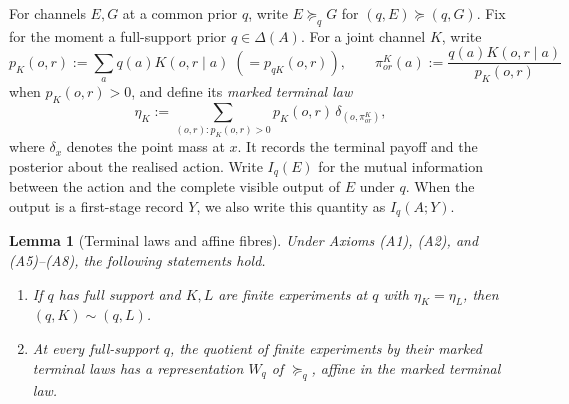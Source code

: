 \documentclass[11pt,a4paper]{article}
\newtheorem{lemma}[theorem]{Lemma}
\theoremstyle{definition}
\newcommand{\D}{\Delta}
\newcommand{\1}{\mathbf 1}
\begin{document}
For channels $E,G$ at a common prior $q$, write $E\succeq_q G$ for
$(q,E)\succeq(q,G)$.  Fix for the moment a full-support prior $q\in\D(A)$.  For a joint channel $K$,
write
\[
p_K(o,r):=\sum_a q(a)K(o,r\mid a)\;(=p_{qK}(o,r)),
\qquad
\pi^K_{or}(a):=\frac{q(a)K(o,r\mid a)}{p_K(o,r)}
\]
when $p_K(o,r)>0$, and define its \emph{marked terminal law}
\begin{equation}
\eta_K:=\sum_{(o,r):p_K(o,r)>0}
p_K(o,r)\,\delta_{(o,\pi^K_{or})},
\label{lf:eq:marked-law}
\end{equation}
where $\delta_x$ denotes the point mass at $x$.
It records the terminal payoff and the posterior about the realised action.
Write $I_q(E)$ for the mutual information between the action and the complete
visible output of $E$ under $q$.  When the output is a first-stage record $Y$,
we also write this quantity as $I_q(A;Y)$.

\begin{lemma}[Terminal laws and affine fibres]\label{lf:lem:terminal-affine}
Under Axioms \textup{(A1)}, \textup{(A2)}, and
\textup{(A5)--(A8)}, the following statements hold.
\begin{enumerate}[label=\textup{(\alph*)},leftmargin=*]
\item If $q$ has full support and $K,L$ are finite experiments at $q$ with
  $\eta_K=\eta_L$, then
  $(q,K)\sim(q,L)$.
\item At every full-support $q$, the quotient of finite experiments by their
  marked terminal laws has a representation $W_q$ of $\succeq_q$, affine in
  the marked terminal law.
\end{enumerate}
\end{lemma}
\end{document}
